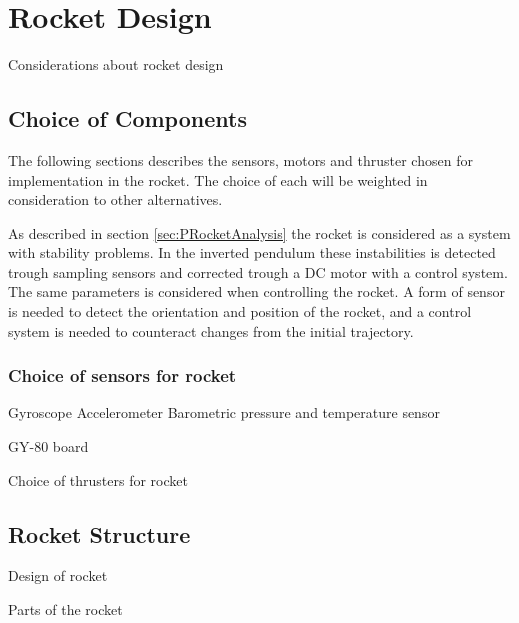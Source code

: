 
\chapter{Rocket Design}

Considerations about rocket design

\section{Choice of Components}
The following sections describes the sensors, motors and thruster chosen for implementation in the rocket. The choice of each will be weighted in consideration to other alternatives.   

As described in section \ref{sec:PRocketAnalysis} the rocket is considered as a system with stability problems. In the inverted pendulum these instabilities is detected trough sampling sensors and corrected trough a DC motor with a control system. The same parameters is considered when controlling the rocket. A form of sensor is needed to detect the orientation and position of the rocket, and a control system is needed to counteract changes from the initial trajectory.

\subsection{Choice of sensors for rocket}

Gyroscope
Accelerometer
Barometric pressure and temperature sensor

GY-80 board

Choice of thrusters for rocket

\section{Rocket Structure}
Design of rocket

Parts of the rocket 


